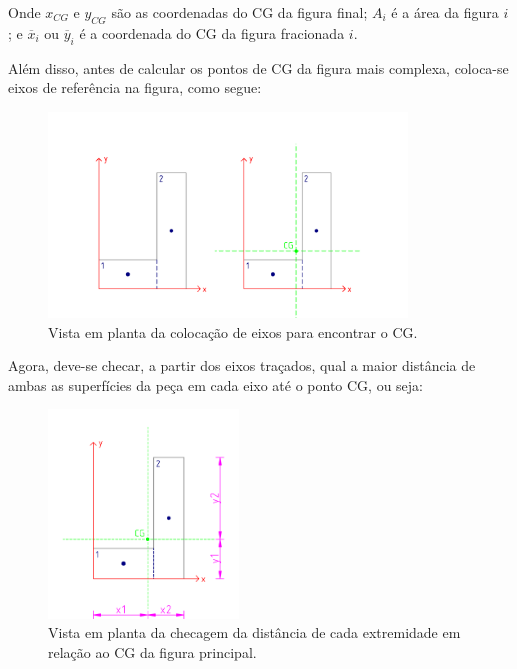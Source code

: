 Onde $x_{CG}$ e $y_{CG}$ são as coordenadas do CG da figura final; $A_i$ é a área da figura $i$; e $\overline{x}_i$ ou $\overline{y}_i$ é a coordenada do CG da figura fracionada $i$.

Além disso, antes de calcular os pontos de CG da figura mais complexa, coloca-se eixos de referência na figura, como segue:

\begin{figure}[H]
	\begin{center}
	\caption{Vista em planta da colocação de eixos para encontrar o CG.}
    	\includegraphics[width=0.85\textwidth]{Fundacoes-rasas-ou-diretas/Imagens/Sapatas-com-secao-LUZ-3.png}
	\end{center}
\end{figure}

Agora, deve-se checar, a partir dos eixos traçados, qual a maior distância de ambas as superfícies da peça em cada eixo até o ponto CG, ou seja:

\begin{figure}[H]
	\begin{center}
	\caption{Vista em planta da checagem da distância de cada extremidade em relação ao CG da figura principal.}
    	\includegraphics[width=0.45\textwidth]{Fundacoes-rasas-ou-diretas/Imagens/Sapatas-com-secao-LUZ-4.png}
	\end{center}
\end{figure}

